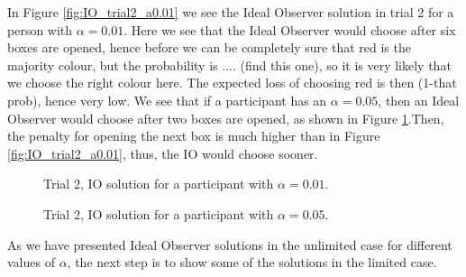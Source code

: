 In Figure \ref{fig:IO_trial2_a0.01} we see the Ideal Observer solution in trial 2 for a person with $\alpha=0.01$. Here we see that the Ideal Observer would choose after six boxes are opened, hence before we can be completely sure that red is the majority colour, but the probability is .... (find this one), so it is very likely that we choose the right colour here. The expected loss of choosing red is then (1-that prob), hence very low. 
We see that if a participant has an $\alpha=0.05$, then an Ideal Observer would choose after two boxes are opened, as shown in Figure \ref{fig:IO_trial2_a0.05}.Then, the penalty for opening the next box is much higher than in Figure \ref{fig:IO_trial2_a0.01}, thus, the IO would choose sooner. 


\begin{figure}
    \centering
    \begin{minipage}{0.45\textwidth}
        \centering
        \scalebox{0.5}{}
        \caption[IO solution for trial 2. $\alpha=0.01$,$\gamma=\kappa=1$]{Trial 2, IO solution for a participant with $\alpha = 0.01$.}
        \label{fig:IO_trial2_a0.01}
    \end{minipage}\hfill
    \begin{minipage}{0.45\textwidth}
        \centering
        \scalebox{0.5}{}
        \caption[IO solution for trial 2. $\alpha=0.05$,$\gamma=\kappa=1$]{Trial 2, IO solution for a participant with $\alpha = 0.05$.}
        \label{fig:IO_trial2_a0.05}
    \end{minipage}
\end{figure}

As we have presented Ideal Observer solutions in the unlimited case for different values of $\alpha$, the next step is to show some of the solutions in the limited case. 

